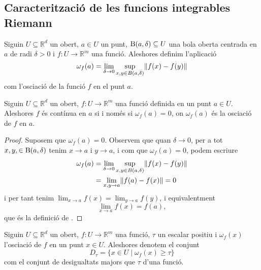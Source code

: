 \documentclass[../Apunts.tex]{subfiles}
\begin{document}
	\subsection{Caracterització de les funcions integrables Riemann}
	\begin{definition}
		\label{def:oscillacio d'una funció en un punt}
		Siguin \(U\subseteq\mathbb{R}^{d}\) un obert, \(a\in U\) un punt, \(\operatorname{B}(a,\delta)\subseteq U\) una bola oberta centrada en \(a\) de radi \(\delta>0\) i \(f\colon U\to\mathbb{R}^{m}\) una funció. Aleshores definim l'aplicació
		\[\omega_{f}(a)=\lim_{\delta\to0}\sup_{x,y\in B(a,\delta)}\norm{f(x)-f(y)}\]
		com l'osci{\lgem}ació de la funció \(f\) en el punt \(a\).
	\end{definition}
	\begin{proposition}
		\label{prop:oscillació equivalent a contínua}
		Siguin \(U\subseteq\mathbb{R}^{d}\) un obert, \(f\colon U\to\mathbb{R}^{m}\) una funció definida en un punt \(a\in U\). Aleshores \(f\) és contínua en \(a\) si i només si \(\omega_{f}(a)=0\), on \(\omega_{f}(a)\) és la osci{\lgem}ació de \(f\) en \(a\).
		\begin{proof}
			Suposem que \(\omega_{f}(a)=0\). Observem que quan \(\delta\to0\), per a tot \(x,y,\in\operatorname{B}(a,\delta)\) tenim \(x\to a\) i \(y\to a\), i com que \(\omega_{f}(a)=0\), podem escriure
			\begin{align*}
			\omega_{f}(a)&=\lim_{\delta\to0}\sup_{x,y\in B(a,\delta)}\norm{f(x)-f(y)}\\
			&=\lim_{x,y\to a}\norm{f(a)-f(x)}=0
			\end{align*}
			i per tant tenim \(\lim_{x\to a}f(x)=\lim_{y\to a}f(y)\), i equivalentment
			\[\lim_{x\to a}f(x)=f(a),\]
			que és la definició de .
		\end{proof}
	\end{proposition}
	\begin{definition}
		\label{def:conjunt de discontinuïtats d'una funció}
		Siguin \(U\subseteq\mathbb{R}^{d}\) un obert, \(f\colon U\to\mathbb{R}^{m}\) una funció, \(\tau\) un escalar positiu i \(\omega_{f}(x)\) l'osci{\lgem}ació de \(f\) en un punt \(x\in U\).
		Aleshores denotem el conjunt
		\[D_{\tau}=\{x\in U\mid\omega_{f}(x)\geq\tau\}\]
		com el conjunt de desigualtats majors que \(\tau\) d'una funció.
	\end{definition}
\end{document}
